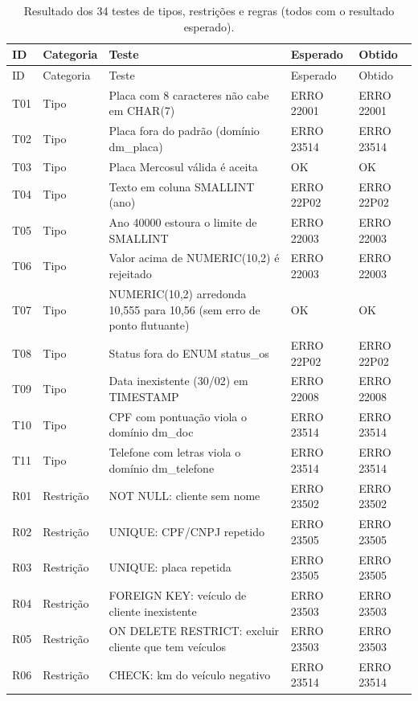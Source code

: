 \documentclass[a4paper,12pt]{article}
\newcommand{\cod}[1]{\texttt{\small #1}}
\begin{document}
{\footnotesize\setlength{\tabcolsep}{4pt}\renewcommand{\cod}[1]{\texttt{#1}}
\begin{longtable}{p{0.7cm}p{1.4cm}p{6.9cm}ll}
  \caption{Resultado dos 34 testes de tipos, restrições e regras (todos com o resultado esperado).}\label{tab:testes}\\
  \hline
  ID & Categoria & Teste & Esperado & Obtido \\ \hline
  \endfirsthead
  \hline
  ID & Categoria & Teste & Esperado & Obtido \\ \hline
  \endhead
  \hline
  \endfoot
  T01 & Tipo & Placa com 8 caracteres não cabe em CHAR(7) & ERRO 22001 & ERRO 22001 \\
  T02 & Tipo & Placa fora do padrão (domínio dm\_placa) & ERRO 23514 & ERRO 23514 \\
  T03 & Tipo & Placa Mercosul válida é aceita & OK & OK \\
  T04 & Tipo & Texto em coluna SMALLINT (ano) & ERRO 22P02 & ERRO 22P02 \\
  T05 & Tipo & Ano 40000 estoura o limite de SMALLINT & ERRO 22003 & ERRO 22003 \\
  T06 & Tipo & Valor acima de NUMERIC(10,2) é rejeitado & ERRO 22003 & ERRO 22003 \\
  T07 & Tipo & NUMERIC(10,2) arredonda 10,555 para 10,56 (sem erro de ponto flutuante) & OK & OK \\
  T08 & Tipo & Status fora do ENUM status\_os & ERRO 22P02 & ERRO 22P02 \\
  T09 & Tipo & Data inexistente (30/02) em TIMESTAMP & ERRO 22008 & ERRO 22008 \\
  T10 & Tipo & CPF com pontuação viola o domínio dm\_doc & ERRO 23514 & ERRO 23514 \\
  T11 & Tipo & Telefone com letras viola o domínio dm\_telefone & ERRO 23514 & ERRO 23514 \\
  R01 & Restrição & NOT NULL: cliente sem nome & ERRO 23502 & ERRO 23502 \\
  R02 & Restrição & UNIQUE: CPF/CNPJ repetido & ERRO 23505 & ERRO 23505 \\
  R03 & Restrição & UNIQUE: placa repetida & ERRO 23505 & ERRO 23505 \\
  R04 & Restrição & FOREIGN KEY: veículo de cliente inexistente & ERRO 23503 & ERRO 23503 \\
  R05 & Restrição & ON DELETE RESTRICT: excluir cliente que tem veículos & ERRO 23503 & ERRO 23503 \\
  R06 & Restrição & CHECK: km do veículo negativo & ERRO 23514 & ERRO 23514 \\

\end{longtable}}
\end{document}
